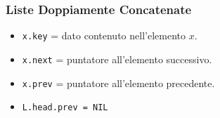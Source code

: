 \subsubsection{Liste Doppiamente Concatenate}
\begin{itemize}
    \item \texttt{x.key} = dato contenuto nell'elemento $x$.
    \item \texttt{x.next} = puntatore all'elemento successivo.
    \item \texttt{x.prev} = puntatore all'elemento precedente.
    \item \texttt{L.head.prev = NIL}
\end{itemize}